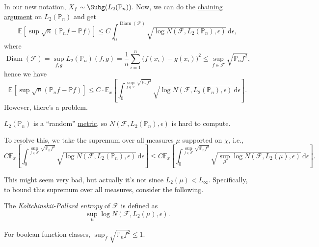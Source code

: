 In our new notation, \(X_f \sim \Subg(L_2(\mathbb{P} _n))\). Now, we can do the \hyperref[note:chaining]{chaining argument} on \(L_2(\mathbb{P} _n)\) and get
\[
	\mathbb{E}_{}\left[\sup \sqrt{n} (\mathbb{P} _n f - \mathbb{P} f) \right]
	\leq C\int_{0}^{\mathop{\mathrm{Diam}}(\mathscr{F} ) } \sqrt{\log N(\mathscr{F} , L_2(\mathbb{P} _n), \epsilon )} \,\mathrm{d}\epsilon ,
\]
where
\[
	\mathop{\mathrm{Diam}}(\mathscr{F} )
	= \sup _{f, g} L_2(\mathbb{P} _n)(f, g) = \frac{1}{n} \sum_{i=1}^{n} \big(f(x_i) - g(x_i)\big)^2
	\leq \sup _{f\in \mathscr{F} } \sqrt{\mathbb{P} _n f^2},
\]
hence we have
\[
	\mathbb{E}_{}\left[\sup \sqrt{n} (\mathbb{P} _n f - \mathbb{P} f) \right]
	\leq C\cdot \mathbb{E}_{x}\left[ \int_{0}^{\sup \limits_{f\in \mathscr{F} } \sqrt{\mathbb{P} _n f^2} } \sqrt{\log N(\mathscr{F} , L_2(\mathbb{P} _n), \epsilon )} \,\mathrm{d}\epsilon \right].
\]
However, there's a problem.

\begin{problem*}
	\(L_2(\mathbb{P} _n)\) is a ``random'' \hyperref[def:pseudo-metric]{metric}, so \(N(\mathscr{F} , L_2(\mathbb{P} _n), \epsilon )\) is hard to compute.
\end{problem*}
\begin{answer}
	To resolve this, we take the supremum over all measures \(\mu \) supported on \(\chi \), i.e.,
	\[
		C \mathbb{E}_{x}\left[\int_{0}^{\sup\limits_{f\in \mathscr{F} } \sqrt{\mathbb{P} _n f^2} } \sqrt{\log N(\mathscr{F} , L_2(\mathbb{P} _n), \epsilon )} \,\mathrm{d}\epsilon \right]
		\leq C \mathbb{E}_{x}\left[\int_{0}^{\sup\limits_{f\in \mathscr{F} } \sqrt{\mathbb{P} _n f^2} } \sqrt{\sup _\mu \log N(\mathscr{F} , L_2(\mu ), \epsilon )} \,\mathrm{d}\epsilon \right].
	\]
\end{answer}

This might seem very bad, but actually it's not since \(L_2(\mu ) < L_\infty\). Specifically, to bound this supremum over all measures, consider the following.

\begin{definition}\label{def:Koltchinskii-Pollard-entropy}
	The \emph{Koltchinskii-Pollard entropy} of \(\mathscr{F} \) is defined as
	\[
		\sup _{\mu } \log N(\mathscr{F} , L_2(\mu ), \epsilon ).
	\]
\end{definition}

\begin{eg}
	For boolean function classes, \(\sup _f \sqrt{\mathbb{P} _n f^2} \leq 1\).
\end{eg}

